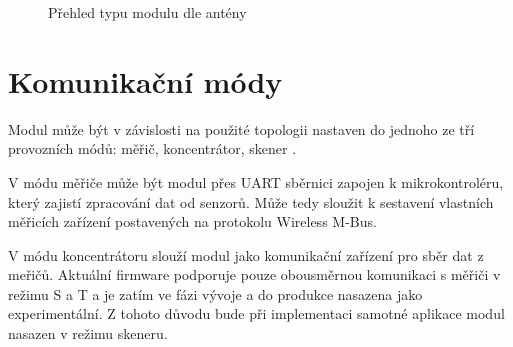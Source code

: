 \begin{figure}[!ht]
    \centering
			\hspace*{5mm}
			\hspace*{5mm}
		\caption{Přehled typu modulu dle antény \cite{ModulIQRF}}
		\label{ObrazekAnteny}
\end{figure}

\section{Komunikační módy}

Modul může být v závislosti na použité topologii nastaven do jednoho ze tří provozních módů: měřič, koncentrátor, skener \cite{ModulIQRF}. 

V módu měřiče může být modul přes UART sběrnici zapojen k mikrokontroléru, který zajistí zpracování dat od senzorů. Může tedy sloužit k sestavení vlastních měřicích zařízení postavených na protokolu Wireless M-Bus.

V módu koncentrátoru slouží modul jako komunikační zařízení pro sběr dat z meřičů. Aktuální firmware podporuje pouze obousměrnou komunikaci s měřiči v režimu S a T a je zatím ve fázi vývoje a do produkce nasazena jako experimentální. Z tohoto důvodu bude při implementaci samotné aplikace modul nasazen v režimu skeneru.

